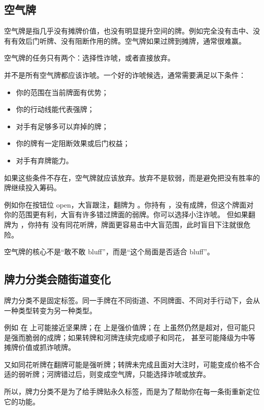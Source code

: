 \subsection{空气牌}

空气牌是指几乎没有摊牌价值，也没有明显提升空间的牌。例如完全没有击中、没有有效后门听牌、没有阻断作用的牌。空气牌如果过牌到摊牌，通常很难赢。

空气牌的任务只有两个：选择性诈唬，或者直接放弃。

并不是所有空气牌都应该诈唬。一个好的诈唬候选，通常需要满足以下条件：

\begin{itemize}
\item 你的范围在当前牌面有优势；
\item 你的行动线能代表强牌；
\item 对手有足够多可以弃掉的牌；
\item 你的牌有一定阻断效果或后门权益；
\item 对手有弃牌能力。
\end{itemize}

如果这些条件不存在，空气牌就应该放弃。放弃不是软弱，而是避免把没有胜率的牌继续投入筹码。

例如你在按钮位 open，大盲跟注，翻牌为 。你持有 ，没有成牌，但这个牌面对你的范围更有利，大盲有许多错过牌面的弱牌。你可以选择小注诈唬。
但如果翻牌为 ，你持有  没有同花听牌，牌面更容易击中大盲范围，此时盲目下注就很危险。

空气牌的核心不是“敢不敢 bluff”，而是“这个局面是否适合 bluff”。

\subsection{牌力分类会随街道变化}

牌力分类不是固定标签。同一手牌在不同街道、不同牌面、不同对手行动下，会从一种类型转变为另一种类型。

例如  在  上可能接近坚果牌；在  上是强价值牌；在  上虽然仍然是超对，但可能只是强而脆弱的成牌；如果转牌和河牌连续完成顺子和同花， 甚至可能降级为中等摊牌价值或抓诈唬牌。

又如同花听牌在翻牌可能是强听牌；转牌未完成且面对大注时，可能变成价格不合适的弱听牌；河牌错过后，则变成空气牌，只能选择诈唬或放弃。

所以，牌力分类不是为了给手牌贴永久标签，而是为了帮助你在每一条街重新定位它的功能。


